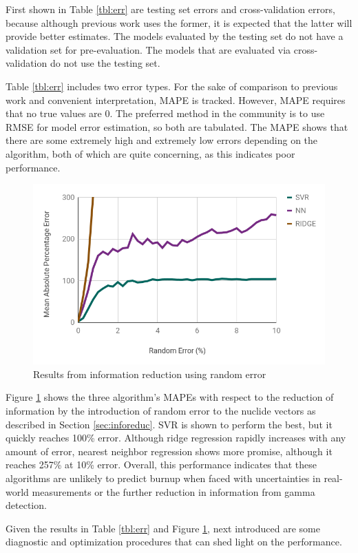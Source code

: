 First shown in Table \ref{tbl:err} are testing set errors and cross-validation
errors, because although previous work uses the former, it is expected that the
latter will provide better estimates.  The models evaluated by the testing set
do not have a validation set for pre-evaluation.  The models that are evaluated
via cross-validation do not use the testing set. 

Table \ref{tbl:err} includes two error types.  For the sake of comparison to
previous work and convenient interpretation, \gls{MAPE} is tracked. However,
\gls{MAPE} requires that no true values are $0$.  The preferred method in the
community is to use \gls{RMSE} for model error estimation, so both are
tabulated.  The \gls{MAPE} shows that there are some extremely high and
extremely low errors depending on the algorithm, both of which are quite
concerning, as this indicates poor performance.  

\begin{figure}[!htb]
  \centering
  \includegraphics[width=\linewidth]{./chapters/demo_method/randerr.png}
  \caption{Results from information reduction using random error}
  \label{fig:randerr}
\end{figure}

Figure \ref{fig:randerr} shows the three algorithm's \gls{MAPE}s with respect
to the reduction of information by the introduction of random error to the
nuclide vectors as described in Section \ref{sec:inforeduc}.  \gls{SVR} is
shown to perform the best, but it quickly reaches 100\% error.  Although ridge
regression rapidly increases with any amount of error, nearest neighbor
regression shows more promise, although it reaches 257\% at 10\% error.
Overall, this performance indicates that these algorithms are unlikely to
predict burnup when faced with uncertainties in real-world measurements or
the further reduction in information from gamma detection.

Given the results in Table \ref{tbl:err} and Figure \ref{fig:randerr}, next
introduced are some diagnostic and optimization procedures that can shed light
on the performance.
